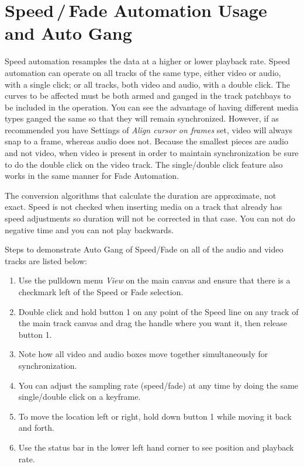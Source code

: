 \section{Speed\,/\,Fade Automation Usage and Auto Gang}%
\label{sec:speed_fade_automation_gang}

Speed automation resamples the data at a higher or lower playback rate. Speed automation can operate
on all tracks of the same type, either video or audio, with a single click; or all tracks, both video and
audio, with a double click. The curves to be affected must be both armed and ganged in the track
patchbays to be included in the operation. You can see the advantage of having different media types
ganged the same so that they will remain synchronized.  However, if as recommended you have Settings of \textit{Align cursor on frames} set, video will always snap to a frame, whereas audio does not.  Because the smallest pieces are audio and not video, when video is present in order to maintain synchronization be sure to do the double click on the video track.  The single/double click feature also works in the same manner for Fade Automation.

The conversion algorithms that calculate the duration are approximate, not exact.   Speed is not checked when inserting media on a track that already has speed adjustments so duration will not be corrected in that case.  You can not do negative time and you can not play backwards.

Steps to demonstrate Auto Gang of Speed/Fade on all of the audio and video tracks are listed below:

\begin{enumerate}
    \item Use the pulldown menu \textit{View} on the main canvas and ensure that there is a checkmark left of the Speed or Fade selection.
    \item Double click and hold button 1 on any point of the Speed line on any track of the main track canvas and drag the handle where you want it, then release button 1.
    \item Note how all video and audio boxes move together simultaneously for synchronization.
    \item You can adjust the sampling rate (speed/fade) at any time by doing the same single/double
    click on a keyframe.
    \item To move the location left or right, hold down button 1 while moving it back and forth.
    \item Use the status bar in the lower left hand corner to see position and playback rate.
\end{enumerate}


